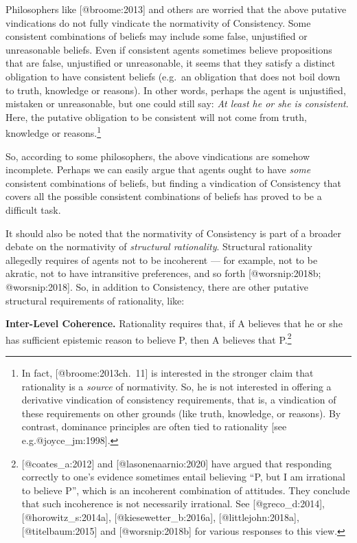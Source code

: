 \documentclass[
]{article}
\begin{document}
\noindent Philosophers like {[}@broome:2013{]} and others are worried
that the above putative vindications do not fully vindicate the
normativity of Consistency. Some consistent combinations of beliefs may
include some false, unjustified or unreasonable beliefs. Even if
consistent agents sometimes believe propositions that are false,
unjustified or unreasonable, it seems that they satisfy a distinct
obligation to have consistent beliefs (e.g.~an obligation that does not
boil down to truth, knowledge or reasons). In other words, perhaps the
agent is unjustified, mistaken or unreasonable, but one could still say:
\emph{At least he or she is consistent}. Here, the putative obligation
to be consistent will not come from truth, knowledge or
reasons.\footnote{In fact, {[}@broome:2013ch.~11{]} is interested in the
  stronger claim that rationality is a \emph{source} of normativity. So,
  he is not interested in offering a derivative vindication of
  consistency requirements, that is, a vindication of these requirements
  on other grounds (like truth, knowledge, or reasons). By contrast,
  dominance principles are often tied to rationality {[}see
  e.g.@joyce\_jm:1998{]}.}

So, according to some philosophers, the above vindications are somehow
incomplete. Perhaps we can easily argue that agents ought to have
\emph{some} consistent combinations of beliefs, but finding a
vindication of Consistency that covers all the possible consistent
combinations of beliefs has proved to be a difficult task.

It should also be noted that the normativity of Consistency is part of a
broader debate on the normativity of \emph{structural rationality}.
Structural rationality allegedly requires of agents not to be incoherent
--- for example, not to be akratic, not to have intransitive
preferences, and so forth {[}@worsnip:2018b; @worsnip:2018{]}. So, in
addition to Consistency, there are other putative structural
requirements of rationality, like:

\textbf{Inter-Level Coherence.} Rationality requires that, if A believes
that he or she has sufficient epistemic reason to believe P, then A
believes that P.\footnote{{[}@coates\_a:2012{]} and
  {[}@lasonenaarnio:2020{]} have argued that responding correctly to
  one's evidence sometimes entail believing ``P, but I am irrational to
  believe P'', which is an incoherent combination of attitudes. They
  conclude that such incoherence is not necessarily irrational. See
  {[}@greco\_d:2014{]}, {[}@horowitz\_s:2014a{]},
  {[}@kiesewetter\_b:2016a{]}, {[}@littlejohn:2018a{]},
  {[}@titelbaum:2015{]} and {[}@worsnip:2018b{]} for various responses
  to this view.}
\end{document}
